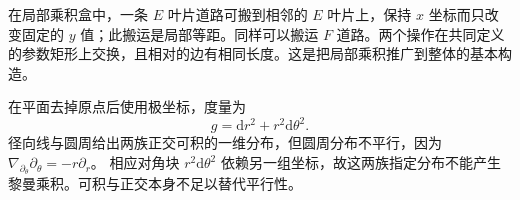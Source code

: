 在局部乘积盒中，一条 \(E\) 叶片道路可搬到相邻的 \(E\) 叶片上，保持 \(x\) 坐标而只改变固定的 \(y\) 值；此搬运是局部等距。同样可以搬运 \(F\) 道路。两个操作在共同定义的参数矩形上交换，且相对的边有相同长度。这是把局部乘积推广到整体的基本构造。

\begin{example}\label{g3:exm:orthogonal-foliations-not-parallel}
	在平面去掉原点后使用极坐标，度量为
	\[
		g=\mathrm dr^2+r^2\mathrm d\theta^2.
	\]
	径向线与圆周给出两族正交可积的一维分布，但圆周分布不平行，因为
	\(\nabla_{\partial_\theta}\partial_\theta=-r\partial_r\)。
	相应对角块 \(r^2\mathrm d\theta^2\) 依赖另一组坐标，故这两族指定分布不能产生黎曼乘积。可积与正交本身不足以替代平行性。
\end{example}
